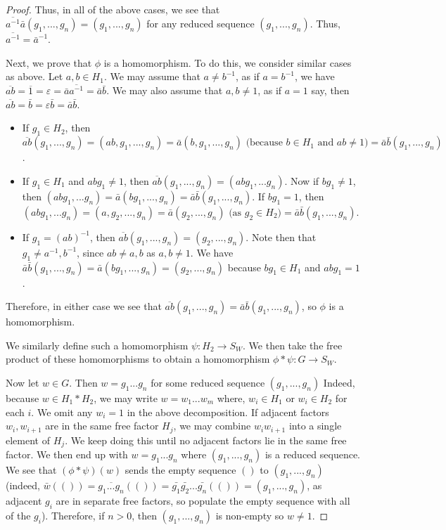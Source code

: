 \documentclass[12pt]{article}
\newcommand{\vs}{\vskip10pt}
\begin{document}
\begin{proof}
	Thus, in all of the above cases, we see that $\overline{a^{-1}} \bar{a} (g_1,...,g_n) = (g_1,...,g_n)$ for any reduced sequence $(g_1,...,g_n)$. Thus, $\overline{a^{-1}} = \bar{a}^{-1}$. 
	
	\vs
	
	Next, we prove that $\phi$ is a homomorphism. To do this, we consider similar cases as above. Let $a,b \in H_1$. We may assume that $a \neq b^{-1}$, as if $a=b^{-1}$, we have $\overline{a b} = \overline{1} = \varepsilon = \bar{a} \overline{a^{-1}} = \bar{a} \bar{b}$. We may also assume that $a,b \neq 1$, as if $a = 1$ say, then $\overline{ab} = \bar{b} = \varepsilon \bar{b} = \bar{a} \bar{b}$. 
	
	\begin{itemize}
		\item If $g_1 \in H_2$, then $\overline{a b} (g_1,...,g_n) = (ab, g_1,...,g_n) = \bar{a}(b, g_1,...,g_n) \text{ (because } b \in H_1 \text{ and } ab \neq 1) = \bar{a} \bar{b} (g_1,...,g_n)$.
		\item If $g_1 \in H_1$ and $abg_1 \neq 1$, then $\overline{a b} (g_1,...,g_n) = (abg_1,...g_n)$. Now if $b g_1 \neq 1$, then $(abg_1,...g_n) = \bar{a} (bg_1,...,g_n) = \bar{a} \bar{b} (g_1,...,g_n)$. If $bg_1 = 1$, then $(abg_1,...g_n) = (a, g_2,...,g_n) = \bar{a} (g_2,...,g_n) \text{ (as } g_2 \in H_2) = \bar{a} \bar{b} (g_1,...,g_n)$. 
		\item If $g_1 = (ab)^{-1}$, then $\overline{a b} (g_1,...,g_n) = (g_2,...,g_n)$. Note then that $g_1 \neq a^{-1}, b^{-1}$, since $ab \neq a,b$ as $a,b \neq 1$. We have $\bar{a} \bar{b} (g_1,...,g_n) = \bar{a} (bg_1,...,g_n) = (g_2,...,g_n)$ because $bg_1 \in H_1$ and $ab g_1 = 1$. 
	\end{itemize}

	Therefore, in either case we see that $\overline{a b} (g_1,...,g_n) = \bar{a} \bar{b} (g_1,...,g_n)$, so $\phi$ is a homomorphism. 
		
		We similarly define such a homomorphism $\psi: H_2 \rightarrow S_W$. We then take the free product of these homomorphisms to obtain a homomorphism $\phi * \psi: G \rightarrow S_W$. 
		
		\vs 
		
		Now let $w \in G$. Then $w = g_1...g_n$ for some reduced sequence $(g_1,...,g_n)$ Indeed, because $w \in H_1 * H_2$, we may write $w = w_1...w_m$ where, $w_i \in H_1$ or $w_i \in H_2$ for each $i$. We omit any $w_i = 1$ in the above decomposition. If adjacent factors $w_i, w_{i+1}$ are in the same free factor $H_j$, we may combine $w_i w_{i+1}$ into a single element of $H_j$. We keep doing this until no adjacent factors lie in the same free factor. We then end up with $w = g_1 ... g_n$ where $(g_1,...,g_n)$ is a reduced sequence. We see that $(\phi * \psi)(w)$ sends the empty sequence $()$ to $(g_1,...,g_n)$ (indeed, $\bar{w}(()) = \overline{g_1 ... g_n}(()) = \bar{g_1} \bar{g_2}...\bar{g_n} (()) = (g_1,...,g_n)$, as adjacent $g_i$ are in separate free factors, so populate the empty sequence with all of the $g_i$). Therefore, if $n > 0$, then $(g_1,...,g_n)$ is non-empty so $w \neq 1$. 
		
	\end{proof}
\end{document}
